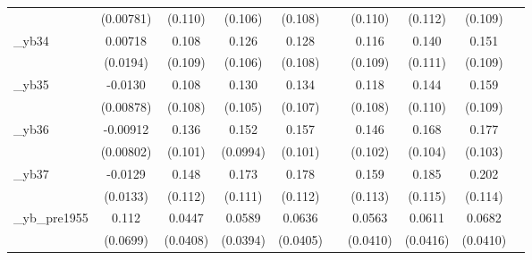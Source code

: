 \begin{table}[htbp]
\begin{tabular}{l*{9}{c}}
            &   (0.00781)         &     (0.110)         &     (0.106)         &     (0.108)         &                     &     (0.110)         &     (0.112)         &     (0.109)         &                     \\
[1em]
\_yb34       &     0.00718         &       0.108         &       0.126         &       0.128         &                     &       0.116         &       0.140         &       0.151         &                     \\
            &    (0.0194)         &     (0.109)         &     (0.106)         &     (0.108)         &                     &     (0.109)         &     (0.111)         &     (0.109)         &                     \\
[1em]
\_yb35       &     -0.0130         &       0.108         &       0.130         &       0.134         &                     &       0.118         &       0.144         &       0.159         &                     \\
            &   (0.00878)         &     (0.108)         &     (0.105)         &     (0.107)         &                     &     (0.108)         &     (0.110)         &     (0.109)         &                     \\
[1em]
\_yb36       &    -0.00912         &       0.136         &       0.152         &       0.157         &                     &       0.146         &       0.168         &       0.177\sym{*}  &                     \\
            &   (0.00802)         &     (0.101)         &    (0.0994)         &     (0.101)         &                     &     (0.102)         &     (0.104)         &     (0.103)         &                     \\
[1em]
\_yb37       &     -0.0129         &       0.148         &       0.173         &       0.178         &                     &       0.159         &       0.185         &       0.202\sym{*}  &                     \\
            &    (0.0133)         &     (0.112)         &     (0.111)         &     (0.112)         &                     &     (0.113)         &     (0.115)         &     (0.114)         &                     \\
[1em]
\_yb\_pre1955 &       0.112         &      0.0447         &      0.0589         &      0.0636         &                     &      0.0563         &      0.0611         &      0.0682\sym{*}  &                     \\
            &    (0.0699)         &    (0.0408)         &    (0.0394)         &    (0.0405)         &                     &    (0.0410)         &    (0.0416)         &    (0.0410)         &                     \\

\end{tabular}
\end{table}
